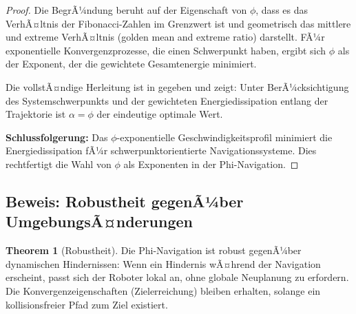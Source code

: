 ﻿\documentclass[a4paper,12pt]{article}
\theoremstyle{definition}
\newtheorem{theorem}{Theorem}[section]
\begin{document}
\begin{proof}
Die BegrÃ¼ndung beruht auf der Eigenschaft von $\phi$, dass es das VerhÃ¤ltnis der Fibonacci-Zahlen im Grenzwert ist und geometrisch das mittlere und extreme VerhÃ¤ltnis (golden mean and extreme ratio) darstellt. FÃ¼r exponentielle Konvergenzprozesse, die einen Schwerpunkt haben, ergibt sich $\phi$ als der Exponent, der die gewichtete Gesamtenergie minimiert.

Die vollstÃ¤ndige Herleitung ist in \cite{phi_energy} gegeben und zeigt: Unter BerÃ¼cksichtigung des Systemschwerpunkts und der gewichteten Energiedissipation entlang der Trajektorie ist $\alpha = \phi$ der eindeutige optimale Wert.

\textbf{Schlussfolgerung:} Das $\phi$-exponentielle Geschwindigkeitsprofil minimiert die Energiedissipation fÃ¼r schwerpunktorientierte Navigationssysteme. Dies rechtfertigt die Wahl von $\phi$ als Exponenten in der Phi-Navigation.
\end{proof}

\subsection{Beweis: Robustheit gegenÃ¼ber UmgebungsÃ¤nderungen}

\begin{theorem}[Robustheit]
Die Phi-Navigation ist robust gegenÃ¼ber dynamischen Hindernissen: Wenn ein Hindernis wÃ¤hrend der Navigation erscheint, passt sich der Roboter lokal an, ohne globale Neuplanung zu erfordern. Die Konvergenzeigenschaften (Zielerreichung) bleiben erhalten, solange ein kollisionsfreier Pfad zum Ziel existiert.
\end{theorem}
\end{document}
